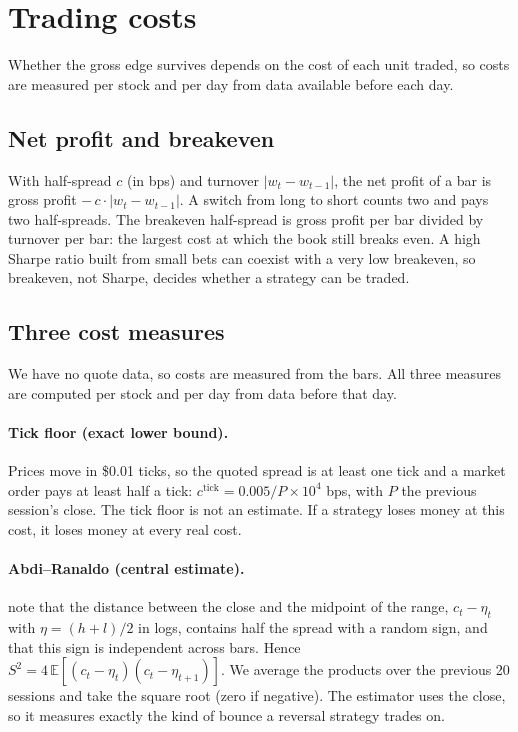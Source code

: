 \documentclass[11pt,a4paper]{article}
\newcommand{\E}{\mathbb{E}}
\begin{document}
\section{Trading costs}
\label{sec:costs}

Whether the gross edge survives depends on the cost of each unit traded, so costs are measured per stock and per day from data available before each day.


\subsection{Net profit and breakeven}

With half-spread $c$ (in bps) and turnover $|w_t-w_{t-1}|$, the net profit of a bar is
gross profit $-\,c\cdot|w_t-w_{t-1}|$. A switch from long to short counts two and pays two half-spreads. The
breakeven half-spread is gross profit per bar divided by turnover per bar: the largest cost at which the
book still breaks even. A high Sharpe ratio built from small bets can coexist with a very low breakeven,
so breakeven, not Sharpe, decides whether a strategy can be traded.

\subsection{Three cost measures}

We have no quote data, so costs are measured from the bars. All three measures are computed per stock
and per day from data before that day.

\paragraph{Tick floor (exact lower bound).} Prices move in \$0.01 ticks, so the quoted spread is at least
one tick and a market order pays at least half a tick: $c^{\text{tick}} = 0.005/P\times10^4$ bps, with $P$
the previous session's close. The tick floor is not an estimate. If a strategy loses money at this cost, it loses
money at every real cost.

\paragraph{Abdi--Ranaldo (central estimate).} \citet{abdi2017} note that the distance between the close
and the midpoint of the range, $c_t-\eta_t$ with $\eta=(h+l)/2$ in logs, contains half the spread with a
random sign, and that this sign is independent across bars. Hence
$S^2 = 4\,\E[(c_t-\eta_t)(c_t-\eta_{t+1})]$. We average the products over the previous
20 sessions and take the square root (zero if negative). The estimator uses the close, so it
measures exactly the kind of bounce a reversal strategy trades on.
\end{document}
